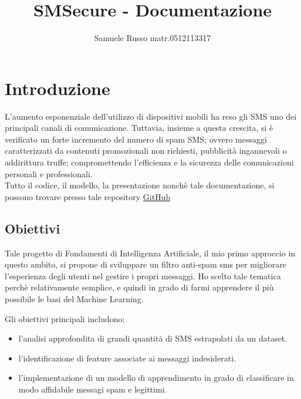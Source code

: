 \documentclass[]{article}
\title{SMSecure - Documentazione}
\author{Samuele Russo   matr.0512113317}
\begin{document}
\maketitle

\newpage

\tableofcontents

\newpage

\section{Introduzione}

    L'aumento esponenziale dell'utilizzo di dispositivi mobili ha reso gli SMS uno dei principali canali di comunicazione. Tuttavia, insieme a questa crescita, si è verificato un forte incremento del numero di spam SMS; ovvero messaggi caratterizzati da contenuti promozionali non richiesti, pubblicità ingannevoli o addirittura truffe; compromettendo l'efficienza e la sicurezza delle comunicazioni personali e professionali.\\
    Tutto il codice, il modello, la presentazione nonchè tale documentazione, si possono trovare presso tale repository \href{https://github.com/russosamuele/SMSecure.git}{GitHub}


    \subsection{Obiettivi}

        Tale progetto di Fondamenti di Intelligenza Artificiale, il mio primo approccio in questo ambito, si propone di sviluppare un filtro anti-spam sms per migliorare l'esperienza degli utenti nel gestire i propri messaggi. Ho scelto tale tematica perchè relativamente semplice, e quindi in grado di farmi apprendere il più possibile le basi del Machine Learning.

        Gli obiettivi principali includono:
        \begin{itemize}
            \item l'analisi approfondita di grandi quantità di SMS        estrapolati da un dataset.
            \item l'identificazione di feature associate ai               messaggi indesiderati.
            \item l'implementazione di un modello di apprendimento in grado di classificare in modo affidabile messagi spam e legittimi.
        \end{itemize}
\end{document}
